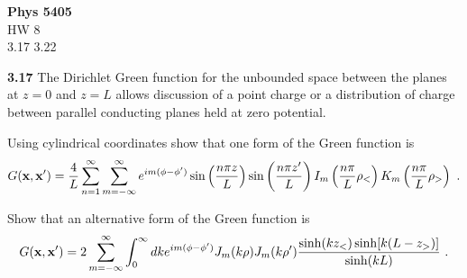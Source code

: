 \documentclass[12pt]{article}
\newcommand{\x}{{\bf x}}
\newcommand{\lb}{\left(}
\newcommand{\rb}{\right)}
\begin{document}
\begin{center}
{\bf Phys 5405}\\
HW 8 \\
3.17 3.22
\end{center}
{\bf 3.17} The Dirichlet Green function for the unbounded space between the planes at $z = 0$ and $z = L$ allows discussion of a point charge or a distribution of charge between parallel conducting planes held at zero potential.

 Using cylindrical coordinates show that one form of the Green function is
\begin{equation}
    G(\x, \x') = \frac{4}{L} \sum_{n = 1}^\infty \sum_{m = - \infty}^\infty e^{im(\phi - \phi')} \sin\left(\frac{n \pi z}{L}\right)\sin\left(\frac{n \pi z'}{L}\right) I_m\lb \frac{n\pi}{L} \rho_<\rb K_m \lb  \frac{n \pi}{L} \rho_>\rb~.
\end{equation}

 Show that an alternative form of the Green function is
\begin{equation}
    G(\x, \x') = 2 \sum_{m = -\infty}^\infty \int_0 ^\infty dk e^{im(\phi -\phi')} J_m(k \rho) J_m(k \rho') \frac{\sinh(k z_<)\sinh[k(L-z_>)]}{\sinh(kL)}~.
\end{equation}
\end{document}
